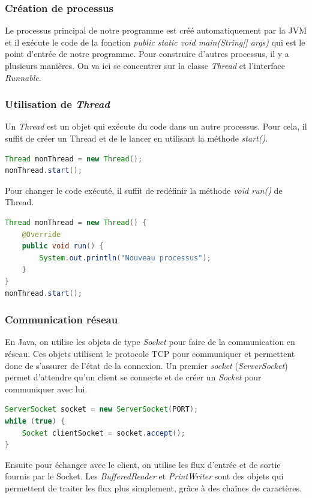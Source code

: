 \subsubsection{Création de processus}
Le processus principal de notre programme est créé automatiquement par la JVM et il exécute le code de la fonction \emph{public static void main(String[] args)} qui est le point d'entrée de notre programme.
Pour construire d'autres processus, il y a plusieurs manières. On va ici se concentrer sur la classe \emph{Thread} et l'interface \emph{Runnable}.
\subsubsection{Utilisation de \emph{Thread}}
Un \emph{Thread} est un objet qui exécute du code dans un autre processus. Pour cela, il suffit de créer un Thread et de le lancer en utilisant la méthode \emph{start()}.
\begin{lstlisting}[language=Java]
Thread monThread = new Thread();
monThread.start();
\end{lstlisting}

Pour changer le code exécuté, il suffit de redéfinir la méthode \emph{void run()} de Thread.
\begin{lstlisting}[language=Java]
Thread monThread = new Thread() {
	@Override
	public void run() {
		System.out.println("Nouveau processus");
	}
}
monThread.start();
\end{lstlisting}

\subsubsection{Communication réseau}
En Java, on utilise les objets de type \emph{Socket} pour faire de la communication en réseau. Ces objets utilisent le protocole TCP pour communiquer et permettent donc de s'assurer de l'état de la connexion.
Un premier \emph{socket} (\emph{ServerSocket}) permet d'attendre qu'un client se connecte et de créer un \emph{Socket} pour communiquer avec lui.
\begin{lstlisting}[language=Java]
ServerSocket socket = new ServerSocket(PORT);
while (true) {
	Socket clientSocket = socket.accept();
}
\end{lstlisting}

Ensuite pour échanger avec le client, on utilise les flux d'entrée et de sortie fournis par le Socket.
Les \emph{BufferedReader} et \emph{PrintWriter} sont des objets qui permettent de traiter les flux plus simplement, grâce à des chaînes de caractères.

